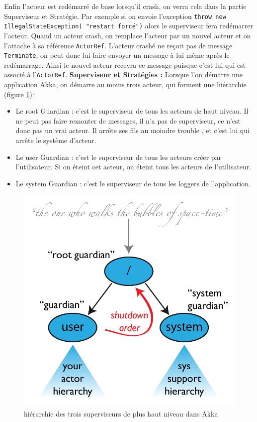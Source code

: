 \documentclass[11pt, a4paper]{article}
\begin{document}
\par Enfin l'acteur est redémarré de base lorsqu'il crash, on verra cela dans la partie Superviseur et Stratégie. Par exemple si on envoie l'exception \texttt{throw new IllegalStateException( "restart forcé")} alors le superviseur fera redémarrer l'acteur. Quand un acteur crash, on remplace l'acteur par un nouvel acteur et on l'attache à sa référence \verb!ActorRef!. L'acteur crashé ne reçoit pas de message \verb!Terminate!, on peut donc lui faire envoyer un message à lui même après le redémarrage. Ainsi le nouvel acteur recevra ce message puisque c'est lui qui est associé à l'\texttt{ActorRef}.
\newline
\newline
\textbf{Superviseur et Stratégies :}
Lorsque l'on démarre une application Akka, on démarre au moins trois acteur, qui forment une hiérarchie (figure \ref{fig2}): 
\begin{itemize}
\item Le root Guardian : c'est le superviseur de tous les acteurs de haut niveau. Il ne peut pas faire remonter de messages, il n'a pas de superviseur, ce n'est donc pas un vrai acteur. Il arrête ses fils  au moindre trouble \cite{akka}, et c'est lui qui arrête le système d'acteur.
\item Le user Guardian : c'est le superviseur de tous les acteurs créer par l'utilisateur. Si on éteint cet acteur, on éteint tous les acteurs de l'utilisateur.
\item Le system Guardian : c'est le superviseur de tous les loggers de l'application.
\newline
\end{itemize}

\begin{figure}
\centering
\includegraphics[scale=1]{guardians.png}
\caption{hiérarchie des trois superviseurs de plus haut niveau dans Akka \cite{akka}}
\label{fig2}
\end{figure}
\end{document}
